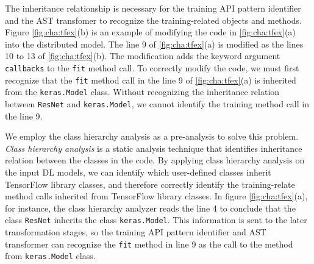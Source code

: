 The inheritance relationship is necessary for the training API pattern
identifier and the AST transfomer to recognize the training-related
objects and methods.
Figure \ref{fig:cha:tfex}(b) is an example of modifying the code in 
\ref{fig:cha:tfex}(a) into the distributed model.
The line 9 of \ref{fig:cha:tfex}(a) is modified as the lines 10 to 13 of 
\ref{fig:cha:tfex}(b). The modification adds the keyword argument 
{\tt callbacks} to the {\tt fit} method call. 
To correctly modify the code, we must first recognize that the {\tt fit} method
call in the line 9 of \ref{fig:cha:tfex}(a) is inherited from the
{\tt keras.Model} class.
Without recognizing the inheritance relation between {\tt ResNet} and
{\tt keras.Model}, we cannot identify the training method call 
in the line 9.  

We employ the class hierarchy analysis as a pre-analysis to solve this problem. 
\textit{Class hierarchy analysis} is a static analysis technique that identifies
inheritance relation between the classes in the code.
By applying class hierarchy analysis on the input DL models,
we can identify which user-defined classes inherit TensorFlow library classes,
and therefore correctly identify the training-relate
method calls inherited from TensorFlow library classes.
In figure \ref{fig:cha:tfex}(a), for instance, 
the class hierarchy analyzer reads the line 4 to conclude that the class
{\tt ResNet} inherits the class {\tt keras.Model}.
This information is sent to the later transformation stages,
so the training API pattern identifier and AST transformer can 
recognize the {\tt fit} method in line 9 as the call to the method from
{\tt keras.Model} class.
